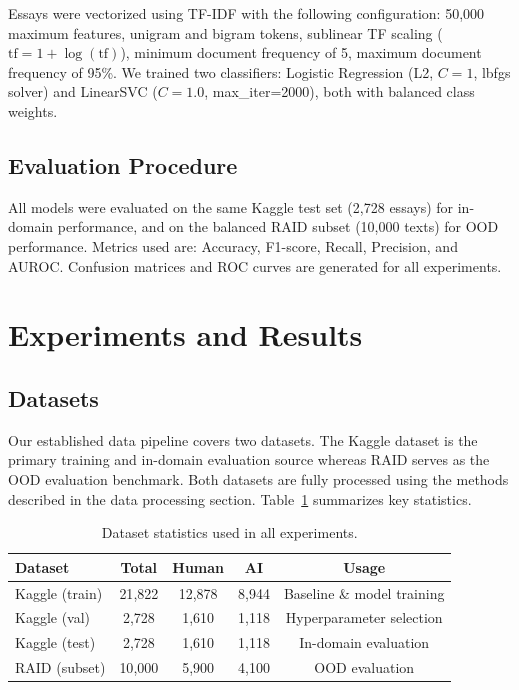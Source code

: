 \documentclass{article} %
\begin{document}
Essays were vectorized using TF-IDF with the following configuration: 50{,}000 maximum features,
unigram and bigram tokens, sublinear TF scaling ($\text{tf} = 1 + \log(\text{tf})$), minimum
document frequency of 5, maximum document frequency of 95\%. We trained two classifiers:
Logistic Regression (L2, $C=1$, lbfgs solver) and LinearSVC ($C=1.0$,
max\_iter=2000), both with balanced class weights.



\subsection{Evaluation Procedure}

All models were evaluated on the same Kaggle test set (2{,}728 essays) for in-domain
performance, and on the balanced RAID subset (10{,}000 texts) for OOD performance. Metrics used are:
Accuracy, F1-score, Recall, Precision, and AUROC. Confusion matrices and
ROC curves are generated for all experiments. 

\section{Experiments and Results}

\subsection{Datasets}

Our established data pipeline covers two datasets. The Kaggle dataset is the primary
training and in-domain evaluation source whereas RAID serves as the OOD evaluation benchmark. Both
datasets are fully processed using the methods described in the data processing section. Table~\ref{tab:data} summarizes key statistics.

\begin{table}[h]
    \centering
    \caption{Dataset statistics used in all experiments.}
    \label{tab:data}
    \small
    \begin{tabular}{lcccc}
        \toprule
        Dataset & Total & Human & AI & Usage \\
        \midrule
        Kaggle (train) & 21{,}822 & 12{,}878 & 8{,}944 & Baseline \& model training \\
        Kaggle (val)   &  2{,}728 &  1{,}610 & 1{,}118 & Hyperparameter selection \\
        Kaggle (test)  &  2{,}728 &  1{,}610 & 1{,}118 & In-domain evaluation \\
        RAID (subset)  & 10{,}000 &  5{,}900 & 4{,}100 & OOD evaluation \\
        \bottomrule
    \end{tabular}
\end{table}
\end{document}
